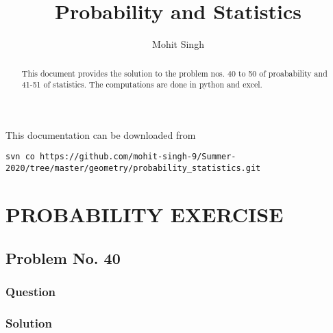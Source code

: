 \documentclass[journal,12pt,twocolumn]{IEEEtran}
\renewcommand\thesection{\arabic{section}}
\renewcommand{\theequation}{\thesection\arabic{equation}}
\begin{document}
\makeatletter
{}
\makeatother
\let\StandardTheFigure\thefigure
\let\vec\mathbf
\def\putbox#1#2#3{\makebox[0in][l]{\makebox[#1][l]{}\raisebox{\baselineskip}[0in][0in]{\raisebox{#2}[0in][0in]{#3}}}}
     \def\rightbox#1{\makebox[0in][r]{#1}}
     \def\centbox#1{\makebox[0in]{#1}}
     \def\topbox#1{\raisebox{-\baselineskip}[0in][0in]{#1}}
     \def\midbox#1{\raisebox{-0.5\baselineskip}[0in][0in]{#1}}
\vspace{3cm}
\title{Probability and Statistics}
\author{Mohit Singh}

\maketitle{}
\newpage
\bigskip
\renewcommand{\thefigure}{\theenumi}
\renewcommand{\thetable}{\theenumi}

\begin{abstract}
This document provides the solution to the problem nos. 40 to 50 of proabability and 41-51 of statistics. The computations are done in python and excel.
\end{abstract}

\noindent This documentation can be downloaded from 
%
\begin{lstlisting}
svn co https://github.com/mohit-singh-9/Summer-2020/tree/master/geometry/probability_statistics.git
\end{lstlisting}
%


\section{PROBABILITY EXERCISE}
\subsection{Problem No. 40}
\subsubsection{Question}

\subsubsection{Solution}

\end{document}
